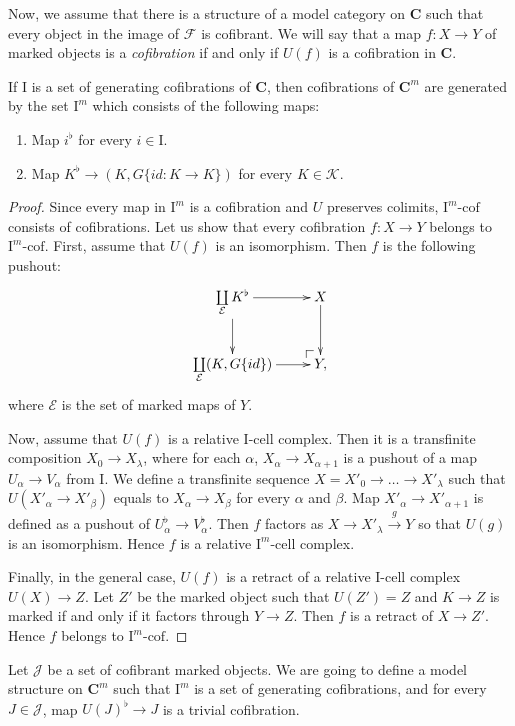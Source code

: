 \documentclass[reqno]{amsart}
\makeatletter
\theoremstyle{definition}
\theoremstyle{remark}
\newcommand{\cat}[1]{\mathbf{#1}}
\newcommand{\C}{\cat{C}}
\newcommand{\I}{\mathrm{I}}
\newcommand{\class}[2]{#1\text{-}\mathrm{#2}}
\newcommand{\Icell}[1][\I]{\class{#1}{cell}}
\newcommand{\Icof}[1][\I]{\class{#1}{cof}}
\numberwithin{figure}{section}
\newcommand{\po}[1][dr]{\save*!/#1+1.2pc/#1:(1,-1)@^{|-}\restore}
\makeatother
\begin{document}
Now, we assume that there is a structure of a model category on $\C$ such that every object in the image of $\mathcal{F}$ is cofibrant.
We will say that a map $f : X \to Y$ of marked objects is a \emph{cofibration} if and only if $U(f)$ is a cofibration in $\C$. 
\begin{prop}
If $\I$ is a set of generating cofibrations of $\C$, then cofibrations of $\C^m$ are generated by the set $\I^m$ which consists of the following maps:
\begin{enumerate}
\item Map $i^\flat$ for every $i \in \I$.
\item Map $K^\flat \to (K, G \{ id : K \to K \})$ for every $K \in \mathcal{K}$.
\end{enumerate}
\end{prop}
\begin{proof}
Since every map in $\I^m$ is a cofibration and $U$ preserves colimits, $\Icof[\I^m]$ consists of cofibrations.
Let us show that every cofibration $f : X \to Y$ belongs to $\Icof[\I^m]$.
First, assume that $U(f)$ is an isomorphism.
Then $f$ is the following pushout:
\[ \xymatrix{ \coprod\limits_\mathcal{E} K^\flat \ar[r] \ar[d] & X \ar[d] \\
              \coprod\limits_\mathcal{E} (K, G \{id\}) \ar[r] & \po Y,
            } \]
where $\mathcal{E}$ is the set of marked maps of $Y$.

Now, assume that $U(f)$ is a relative $\Icell$ complex.
Then it is a transfinite composition $X_0 \to X_\lambda$, where for each $\alpha$, $X_\alpha \to X_{\alpha+1}$ is a pushout of a map $U_\alpha \to V_\alpha$ from $\I$.
We define a transfinite sequence $X = X'_0 \to \ldots \to X'_\lambda$ such that $U(X'_\alpha \to X'_\beta)$ equals to $X_\alpha \to X_\beta$ for every $\alpha$ and $\beta$.
Map $X'_\alpha \to X'_{\alpha+1}$ is defined as a pushout of $U^\flat_\alpha \to V^\flat_\alpha$.
Then $f$ factors as $X \to X'_\lambda \xrightarrow{g} Y$ so that $U(g)$ is an isomorphism.
Hence $f$ is a relative $\Icell[\I^m]$ complex.

Finally, in the general case, $U(f)$ is a retract of a relative $\Icell$ complex $U(X) \to Z$.
Let $Z'$ be the marked object such that $U(Z') = Z$ and $K \to Z$ is marked if and only if it factors through $Y \to Z$.
Then $f$ is a retract of $X \to Z'$.
Hence $f$ belongs to $\Icof[\I^m]$.
\end{proof}

Let $\mathcal{J}$ be a set of cofibrant marked objects.
We are going to define a model structure on $\C^m$ such that $\I^m$ is a set of generating cofibrations,
and for every $J \in \mathcal{J}$, map $U(J)^\flat \to J$ is a trivial cofibration.
\end{document}
